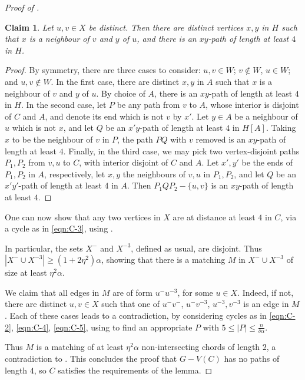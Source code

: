\documentclass[11pt,english]{article}
\theoremstyle{plain}
\newtheorem{claim}[theorem]{Claim}
\theoremstyle{definition}
\theoremstyle{remark}
\def \Xm {X^-}
\def \um {u^-}
\def \vm {v^-}
\def \mthree{^{-3}}
\begin{document}
\begin{proof}[Proof of ]
			\begin{claim} \label{claim:W}
				Let $u, v \in X$ be distinct. Then there are distinct vertices $x,y$ in $H$ such that $x$ is a neighbour of $v$ and $y$ of $u$, and there is an $xy$-path of length at least $4$ in $H$.
			\end{claim}

			\begin{proof}
				By symmetry, there are three cases to consider: $u,v \in W$; $v \notin W$, $u \in W$; and $u,v \notin W$.
				In the first case, there are distinct $x,y$ in $A$ such that $x$ is a neighbour of $v$ and $y$ of $u$. By choice of $A$, there is an $xy$-path of length at least $4$ in $H$. In the second case, let $P$ be any path from $v$ to $A$, whose interior is disjoint of $C$ and $A$, and denote its end which is not $v$ by $x'$. Let $y \in A$ be a neighbour of $u$ which is not $x$, and let $Q$ be an $x'y$-path of length at least $4$ in $H[A]$. Taking $x$ to be the neighbour of $v$ in $P$, the path $PQ$ with $v$ removed is an $xy$-path of length at least $4$. Finally, in the third case, we may pick two vertex-disjoint paths $P_1,P_2$ from $v,u$ to $C$, with interior disjoint of $C$ and $A$. Let $x',y'$ be the ends of $P_1,P_2$ in $A$, respectively, let $x,y$ the neighbours of $v,u$ in $P_1,P_2$, and let $Q$ be an $x'y'$-path of length at least $4$ in $A$. Then $P_1QP_2 - \{u,v\}$ is an $xy$-path of length at least $4$. 
			\end{proof}

			One can now show that any two vertices in $X$ are at distance at least $4$ in $C$, via a cycle as in \eqref{eqn:C-3}, using .

			In particular, the sets $\Xm$ and $X\mthree$, defined as usual, are disjoint. Thus $|\Xm \cup X\mthree| \ge (1 + 2\eta^2)\alpha$, showing that there is a matching $M$ in $\Xm \cup X\mthree$ of size at least $\eta^2\alpha$. 

			We claim that all edges in $M$ are of form $\um u\mthree$, for some $u \in X$. Indeed, if not, there are distinct $u,v \in X$ such that one of $\um\vm$, $\um v\mthree$, $u\mthree, v\mthree$ is an edge in $M$. Each of these cases leads to a contradiction, by considering cycles as in \eqref{eqn:C-2}, \eqref{eqn:C-4}, \eqref{eqn:C-5}, using  to find an appropriate $P$ with $5 \le |P| \le \frac{n}{\delta\alpha}$.

			Thus $M$ is a matching of at least $\eta^2\alpha$ non-intersecting chords of length $2$, a contradiction to .
			This concludes the proof that $G - V(C)$ has no paths of length $4$, so $C$ satisfies the requirements of the lemma.
		\end{proof}
\end{document}
